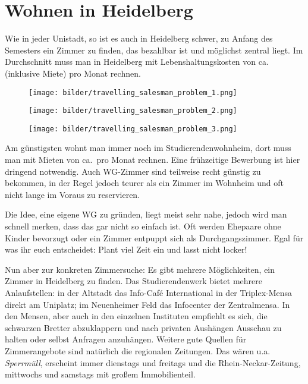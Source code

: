 
\section{Wohnen in Heidelberg}

Wie in jeder Unistadt, so ist es auch in Heidelberg schwer, zu Anfang des Semesters ein Zimmer zu finden, das bezahlbar ist und möglichst zentral liegt. Im Durchschnitt muss man in Heidelberg mit Lebenshaltungskosten von ca. \lebenshaltungskosten (inklusive Miete) pro Monat rechnen.

\begin{figure*}[t]
    \centering
    \begin{subfigure}{.3\textwidth}
        \texttt{[image: bilder/travelling\_salesman\_problem\_1.png]}
    \end{subfigure}
    \begin{subfigure}{.3\textwidth}
        \texttt{[image: bilder/travelling\_salesman\_problem\_2.png]}
    \end{subfigure}
    \begin{subfigure}{.3\textwidth}
        \texttt{[image: bilder/travelling\_salesman\_problem\_3.png]}
    \end{subfigure}
\end{figure*}

Am günstigsten wohnt man immer noch im Studierendenwohnheim, dort muss man mit Mieten von ca.~\studentenwohnheim pro Monat rechnen. Eine frühzeitige Bewerbung ist hier dringend notwendig. Auch WG-Zimmer sind teilweise recht günstig zu bekommen, in der Regel jedoch teurer als ein Zimmer im Wohnheim und oft nicht lange im Voraus zu reservieren.

Die Idee, eine eigene WG zu gründen, liegt meist sehr nahe, jedoch wird man schnell merken, dass das gar nicht so einfach ist. Oft werden Ehepaare ohne Kinder bevorzugt oder ein Zimmer entpuppt sich als Durchgangszimmer. Egal für was ihr euch entscheidet: Plant viel Zeit ein und lasst nicht locker!

Nun aber zur konkreten Zimmersuche: Es gibt mehrere Möglichkeiten, ein Zimmer in Heidelberg zu finden. Das Studierendenwerk bietet mehrere Anlaufstellen: in der Altstadt das Info-Café International in der Triplex-Mensa direkt am Uniplatz; im Neuenheimer Feld das Infocenter der Zentralmensa. In den Mensen, aber auch in den einzelnen Instituten empfiehlt es sich, die schwarzen Bretter abzuklappern und nach privaten Aushängen Ausschau zu halten oder selbst Anfragen anzuhängen. Weitere gute Quellen für Zimmerangebote sind natürlich die regionalen Zeitungen. Das wären u.a. \emph{Sperrmüll}, erscheint immer dienstags und freitags und die Rhein-Neckar-Zeitung, mittwochs und samstags mit großem Immobilienteil. %


